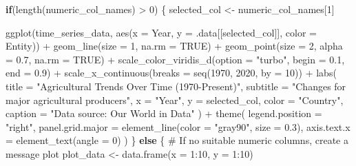 \documentclass[
  letterpaper,
]{book}
\newenvironment{Shaded}{\begin{snugshade}}{\end{snugshade}}
\newcommand{\AttributeTok}[1]{\textcolor[rgb]{0.40,0.45,0.13}{#1}}
\newcommand{\CommentTok}[1]{\textcolor[rgb]{0.37,0.37,0.37}{#1}}
\newcommand{\ConstantTok}[1]{\textcolor[rgb]{0.56,0.35,0.01}{#1}}
\newcommand{\ControlFlowTok}[1]{\textcolor[rgb]{0.00,0.23,0.31}{\textbf{#1}}}
\newcommand{\DecValTok}[1]{\textcolor[rgb]{0.68,0.00,0.00}{#1}}
\newcommand{\FloatTok}[1]{\textcolor[rgb]{0.68,0.00,0.00}{#1}}
\newcommand{\FunctionTok}[1]{\textcolor[rgb]{0.28,0.35,0.67}{#1}}
\newcommand{\NormalTok}[1]{\textcolor[rgb]{0.00,0.23,0.31}{#1}}
\newcommand{\OtherTok}[1]{\textcolor[rgb]{0.00,0.23,0.31}{#1}}
\newcommand{\SpecialCharTok}[1]{\textcolor[rgb]{0.37,0.37,0.37}{#1}}
\newcommand{\StringTok}[1]{\textcolor[rgb]{0.13,0.47,0.30}{#1}}
\begin{document}
\begin{Shaded}
\begin{Highlighting}[]
  \ControlFlowTok{if}\NormalTok{(}\FunctionTok{length}\NormalTok{(numeric\_col\_names) }\SpecialCharTok{\textgreater{}} \DecValTok{0}\NormalTok{) \{}
\NormalTok{    selected\_col }\OtherTok{\textless{}{-}}\NormalTok{ numeric\_col\_names[}\DecValTok{1}\NormalTok{]}
    
    \FunctionTok{ggplot}\NormalTok{(time\_series\_data, }\FunctionTok{aes}\NormalTok{(}\AttributeTok{x =}\NormalTok{ Year, }\AttributeTok{y =}\NormalTok{ .data[[selected\_col]], }\AttributeTok{color =}\NormalTok{ Entity)) }\SpecialCharTok{+}
      \FunctionTok{geom\_line}\NormalTok{(}\AttributeTok{size =} \DecValTok{1}\NormalTok{, }\AttributeTok{na.rm =} \ConstantTok{TRUE}\NormalTok{) }\SpecialCharTok{+}
      \FunctionTok{geom\_point}\NormalTok{(}\AttributeTok{size =} \DecValTok{2}\NormalTok{, }\AttributeTok{alpha =} \FloatTok{0.7}\NormalTok{, }\AttributeTok{na.rm =} \ConstantTok{TRUE}\NormalTok{) }\SpecialCharTok{+}
      \FunctionTok{scale\_color\_viridis\_d}\NormalTok{(}\AttributeTok{option =} \StringTok{"turbo"}\NormalTok{, }\AttributeTok{begin =} \FloatTok{0.1}\NormalTok{, }\AttributeTok{end =} \FloatTok{0.9}\NormalTok{) }\SpecialCharTok{+}
      \FunctionTok{scale\_x\_continuous}\NormalTok{(}\AttributeTok{breaks =} \FunctionTok{seq}\NormalTok{(}\DecValTok{1970}\NormalTok{, }\DecValTok{2020}\NormalTok{, }\AttributeTok{by =} \DecValTok{10}\NormalTok{)) }\SpecialCharTok{+}
      \FunctionTok{labs}\NormalTok{(}
        \AttributeTok{title =} \StringTok{"Agricultural Trends Over Time (1970{-}Present)"}\NormalTok{,}
        \AttributeTok{subtitle =} \StringTok{"Changes for major agricultural producers"}\NormalTok{,}
        \AttributeTok{x =} \StringTok{"Year"}\NormalTok{,}
        \AttributeTok{y =}\NormalTok{ selected\_col,}
        \AttributeTok{color =} \StringTok{"Country"}\NormalTok{,}
        \AttributeTok{caption =} \StringTok{"Data source: Our World in Data"}
\NormalTok{      ) }\SpecialCharTok{+}
      \FunctionTok{theme}\NormalTok{(}
        \AttributeTok{legend.position =} \StringTok{"right"}\NormalTok{,}
        \AttributeTok{panel.grid.major =} \FunctionTok{element\_line}\NormalTok{(}\AttributeTok{color =} \StringTok{"gray90"}\NormalTok{, }\AttributeTok{size =} \FloatTok{0.3}\NormalTok{),}
        \AttributeTok{axis.text.x =} \FunctionTok{element\_text}\NormalTok{(}\AttributeTok{angle =} \DecValTok{0}\NormalTok{)}
\NormalTok{      )}
\NormalTok{  \} }\ControlFlowTok{else}\NormalTok{ \{}
    \CommentTok{\# If no suitable numeric columns, create a message plot}
\NormalTok{    plot\_data }\OtherTok{\textless{}{-}} \FunctionTok{data.frame}\NormalTok{(}\AttributeTok{x =} \DecValTok{1}\SpecialCharTok{:}\DecValTok{10}\NormalTok{, }\AttributeTok{y =} \DecValTok{1}\SpecialCharTok{:}\DecValTok{10}\NormalTok{)}

\end{Highlighting}
\end{Shaded}
\end{document}

